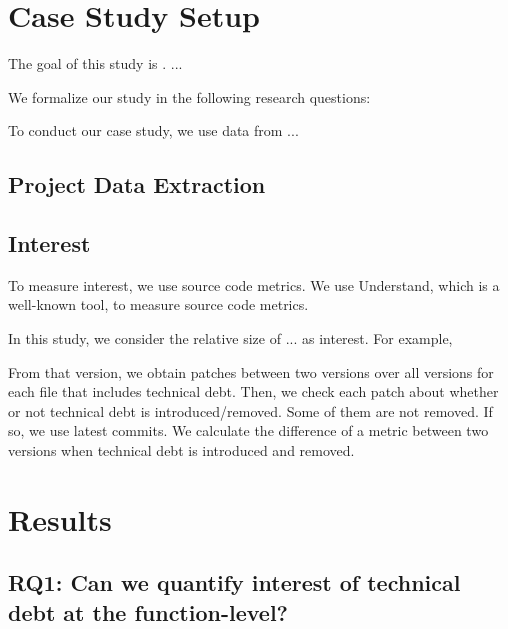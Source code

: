 \documentclass[conference]{IEEEtran}
\begin{document}
\section{Case Study Setup}
The goal of this study is .
...

We formalize our study in the following research questions:


To conduct our case study, we use data from ...

\subsection{Project Data Extraction}

\subsection{Interest}
To measure interest, we use source code metrics. We use Understand, which is a well-known tool, to measure source code metrics. 


In this study, we consider the relative size of ... as interest. For example, 

From that version, we obtain patches between two versions over all versions for each file that includes technical debt. Then, we check each patch about whether or not technical debt is introduced/removed. Some of them are not removed. If so, we use latest commits. We calculate the difference of a metric between two versions when technical debt is introduced and removed.

\section{Results}
\subsection{RQ1: Can we quantify interest of technical debt at the function-level?}


\end{document}
